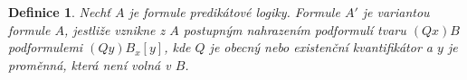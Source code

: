 \documentclass[a4paper, 11pt]{report}
\newtheorem{mydef}{Definice}[chapter]
\newtheorem{veta}{Věta}[chapter]
\newtheorem{lemma}{Lemma}[chapter]
\begin{document}
\begin{comment}
\begin{lemma}
Buď $i_1, \dots, i_n$ libovolná permutace čísel $\{1, \dots, n\}$. Nechť $x_1, \dots, x_n$ jsou proměnné a $A$ formule predikátové logiky. Pak platí:
\begin{enumerate}
	\item $\vdash (\forall x_1) \dots (\forall x_n) A \leftrightarrow (\forall x_{i_1}) \dots (\forall x_{i_n}) A $
	\item $\vdash (\exists x_1) \dots (\exists x_n) A \leftrightarrow (\exists x_{i_1}) \dots (\exists x_{i_n}) A $
\end{enumerate}
\end{lemma}

\begin{veta}
Buď $A$ formule taková, že proměnné $x_1, \dots x_n$ jsou jediné proměnné s volným výskytem v $A$. Pak $\vdash A$, právě když $\vdash \forall x_1 \dots \forall x_n A$
\end{veta}

\begin{veta}
(O ekvivalenci) Nechť formule $A'$ vznikne s formule $A$ nahrazením některých výskytů podformulí $B_1 \dots B_n$ pro řadě formulemi $B'_1, \dots, B'_n$. Je-li $\vdash B_i \leftrightarrow B'_i$ pro všechna $i = 1, \dots, n$, pak platí $\vdash A \leftrightarrow A'$.
\end{veta}

\begin{veta}
Buďte $A, B$ formule a $x$ proměnná. Pak

$$ \vdash (\exists x) \lnot A \leftrightarrow \lnot (\forall x) A $$
$$ \vdash (\forall x) \lnot A \leftrightarrow \lnot (\exists x) A $$

Jestliže $x$ není volná ve formuli $A$ a $\circ$ značí některou z výrokových spojek $\land, \lor, \to$, pak platí

$$ \vdash \forall x (A \circ B) \leftrightarrow (A \circ \forall x B) $$
$$ \vdash \exists x (A \circ B) \leftrightarrow (A \circ \exists x B) $$

pro opačnou implikaci $B \to A$ platí:

$$ \vdash \forall x (B \to A) \leftrightarrow (\exists x B \to A)$$
$$ \vdash \exists x (B \to A) \leftrightarrow (\forall x B \to A)$$
\end{veta}
\end{comment}

\begin{mydef}
Nechť $A$ je formule predikátové logiky. Formule $A'$ je \emph{variantou} formule $A$, jestliže vznikne z $A$ postupným nahrazením podformulí tvaru $(Qx) B$ podformulemi $(Q y) B_x[y]$, kde $Q$ je obecný nebo existenční kvantifikátor a $y$ je proměnná, která není volná v $B$.
\end{mydef}
\end{document}
